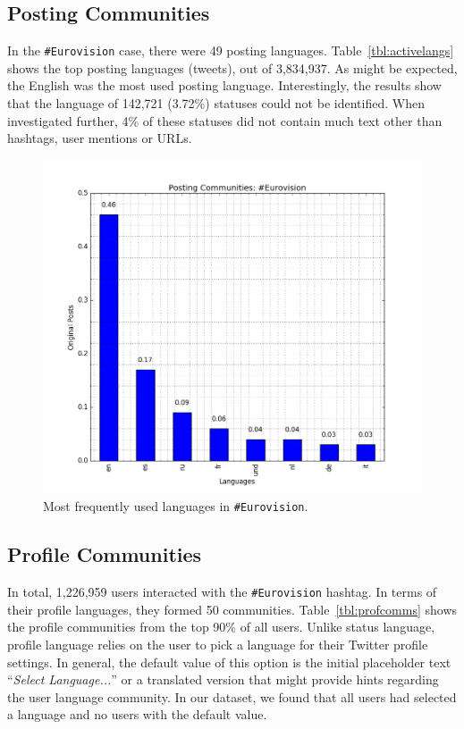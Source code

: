 \subsection{Posting Communities}\label{eurovisionpostingcomm}

In the {\texttt{\#Eurovision}} case, there were 49 posting
languages. Table~\ref{tbl:activelangs} shows the top posting languages
(tweets), out of 3,834,937. As
might be expected, the English was the most used posting
language. Interestingly, the results show that the language of 142,721
(3.72\%) statuses could not be identified. When investigated further,
4\% of these statuses did not contain much text other than
hashtags, user mentions or URLs.

\begin{figure}[htb]
\centering
\includegraphics[width=\columnwidth]{images/eurovision_langfreq.png}
\caption{Most frequently used languages in {\texttt{\#Eurovision}}.}
\label{fig:eurovisionlangfreq}
\end{figure}

\subsection{Profile Communities}\label{ppcomm}

In total, 1,226,959 users interacted with the {\texttt{\#Eurovision}}
hashtag. In terms of their profile languages, they formed 50
communities. Table~\ref{tbl:profcomms} shows the profile communities
from the top 90\% of all users. Unlike status language, profile
language relies on the user to pick a language for their Twitter
profile settings. In general, the default value of this option is the
initial placeholder text ``{\emph{Select Language...}}'' or a
translated version that might provide hints regarding the user
language community. In our dataset, we found that all users had
selected a language and no users with the default value.

